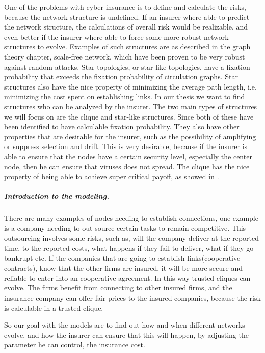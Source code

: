 One of the problems with cyber-insurance is to define and calculate the risks, because the network structure is undefined. If an insurer where able to predict the network structure, the calculations of overall risk would be realizable, and even better if the insurer where able to force some more robust network structures to evolve. 
Examples of such structures are as described in the graph theory chapter, scale-free network, which have been proven to be very robust against random attacks. Star-topologies, or star-like topologies, have a fixation probability that exceeds the fixation probability of circulation graphs. Star structures also have the nice property of minimizing the average path length, i.e. minimizing the cost spent on establishing links.
In our thesis we want to find structures who can be analyzed by the insurer.
The two main types of structures we will focus on are the clique and star-like structures. Since both of these have been identified to have calculable fixation probability. They also have other properties that are desirable for the insurer, such as the possibility of amplifying or suppress selection and drift. This is very desirable, because if the insurer is able to ensure that the nodes have a certain security level, especially the center node, then he can ensure that viruses does not spread.
The clique has the nice property of being able to achieve super critical payoff, as showed in \cite{contagion}. 


\subparagraph{Introduction to the modeling.}
There are many examples of nodes needing to establish connections, one example is a company needing to out-source certain tasks to remain competitive. This outsourcing involves some risks, such as, will the company deliver at the reported time, to the reported costs, what happens if they fail to deliver, what if they go bankrupt etc. If the companies that are going to establish links(cooperative contracts), know that the other firms are insured, it will be more secure and reliable to enter into an cooperative agreement. In this way trusted cliques can evolve. The firms benefit from connecting to other insured firms, and the insurance company can offer fair prices to the insured companies, because the risk is calculable in a trusted clique.

So our goal with the models are to find out how and when different networks evolve, and how the insurer can ensure that this will happen, by adjusting the parameter he can control, the insurance cost. 

